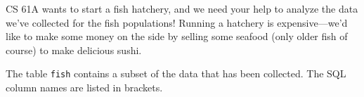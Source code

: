 \question CS 61A wants to start a fish hatchery, and we need your help to analyze the data we've collected for the fish populations! Running a hatchery is expensive---we'd like to make some money on the side by selling some seafood (only older fish of course) to make delicious sushi. 

The table \lstinline{fish} contains a subset of the data that has been collected. The SQL column names are listed in brackets. 
